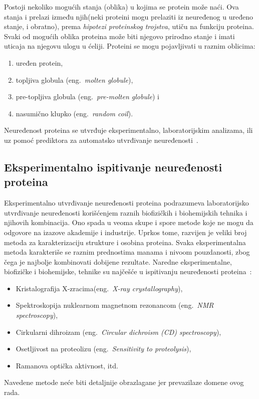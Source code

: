 Postoji nekoliko mogućih stanja (oblika) u kojima se protein može naći. Ova stanja i prelazi između njih(neki proteini mogu prelaziti iz neuređenog u uređeno stanje, i obratno), prema {\em hipotezi proteinskog trojstva}, utiču na funkciju proteina. Svaki od mogućih oblika proteina može biti njegovo prirodno stanje i imati uticaja na njegovu ulogu u ćeliji. Proteini se mogu pojavljivati u raznim oblicima:
\begin{enumerate}
\item uređen protein,
\item topljiva globula (eng.~{\em molten globule}),
\item pre-topljiva globula (eng.~{\em pre-molten globule}) i 
\item nasumično klupko (eng.~{\em random coil}).
\end{enumerate}

Neuređenost proteina se utvrđuje eksperimentalno, laboratorijskim analizama, ili uz pomoć prediktora za automatsko utvrđivanje neuređenosti~\cite{JKd,IDP,IDPIDPr,DPC, IDPiH, BinaryClass}. 

\subsection{Eksperimentalno ispitivanje neuređenosti proteina}
\label{eksperimentalno}
Eksperimentalno utvrđivanje neuređenosti proteina podrazumeva laboratorijsko utvrđivanje neuređenosti korišćenjem raznih biofizičkih i biohemijskih tehnika i njihovih kombinacija. Ono spada u veoma skupe i spore metode koje ne mogu da odgovore na izazove akademije i industrije. Uprkos tome, razvijen je veliki broj metoda za karakterizaciju strukture i osobina proteina. Svaka eksperimentalna metoda karakteriše se raznim prednostima manama i nivoom pouzdanosti, zbog čega je najbolje kombinovati dobijene rezultate. Naredne eksperimentalne, biofizičke i biohemijske, tehnike su najčešće u ispitivanju neuređenosti proteina~\cite{IDP,JKd}:
\begin{itemize}
\item Kristalografija X-zracima(eng.~{\em X-ray crystallography}),
\item Spektroskopija nuklearnom magnetnom rezonancom (eng.~{\em NMR spectroscopy}),
\item Cirkularni dihroizam (eng.~{\em Circular dichroism (CD) spectroscopy}),
\item Osetljivost na proteolizu (eng.~{\em Sensitivity to proteolysis}),
\item Ramanova optička aktivnost, itd. 
\end{itemize}
Navedene metode neće biti detaljnije obrazlagane jer prevazilaze domene ovog rada. 

